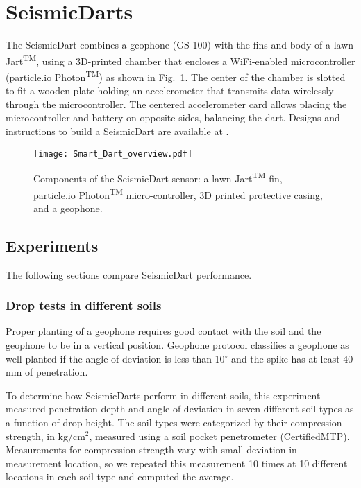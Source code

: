 \section{SeismicDarts}\label{sec:SeismicDarts}

The SeismicDart combines a geophone (GS-100) with the fins and body of a lawn Jart\textsuperscript{TM}, using a 3D-printed chamber that encloses a WiFi-enabled microcontroller (particle.io Photon\textsuperscript{TM}) as shown in Fig.~\ref{fig:Smart_Dart_overview}. 
The center of the chamber is slotted to fit a wooden plate holding an accelerometer that transmits data wirelessly through the microcontroller. 
The centered accelerometer card allows placing the microcontroller and battery on opposite sides, balancing the dart.
Designs and instructions to build a SeismicDart are available at \cite{Victor2016Thingiverse}.



\begin{figure} \centering
{\texttt{[image: Smart\_Dart\_overview.pdf]}}
\caption{Components of the SeismicDart sensor: a lawn  Jart\textsuperscript{TM} fin, particle.io Photon\textsuperscript{TM}  micro-controller, 3D printed protective casing, and a geophone.} 
\label{fig:Smart_Dart_overview}
\end{figure}

\subsection{Experiments} 
The following sections compare SeismicDart performance.
\subsubsection{ Drop tests in different soils}  


Proper planting of a geophone requires good contact with the soil and the geophone to be in a vertical position. 
Geophone protocol classifies a geophone as well planted if the angle of deviation is less than 10$^\circ$ and the spike has at least 40 mm of penetration.

To determine how SeismicDarts perform in different soils, this experiment measured penetration depth and angle of deviation in seven different soil types as a function of drop height. 
 The soil types were categorized by their compression strength, in kg/cm$^2$, measured using a soil pocket penetrometer (CertifiedMTP). Measurements for compression strength vary with small deviation in measurement location, so we repeated this measurement 10 times at 10 different locations in each soil type and computed the average.
 
